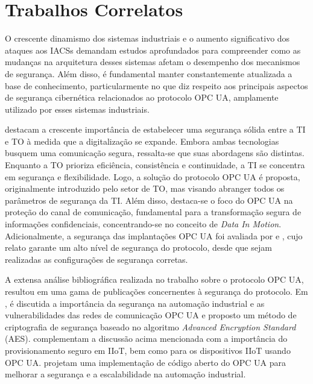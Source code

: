     \section{Trabalhos Correlatos} \label{sec:trabCorrelatos}

    O crescente dinamismo dos sistemas industriais e o aumento significativo dos ataques aos IACSs demandam estudos aprofundados para compreender como as mudanças na arquitetura desses sistemas afetam o desempenho dos mecanismos de segurança. Além disso, é fundamental manter constantemente atualizada a base de conhecimento, particularmente no que diz respeito aos principais aspectos de segurança cibernética relacionados ao protocolo OPC UA, amplamente utilizado por esses sistemas industriais.

     destacam a crescente importância de estabelecer uma segurança sólida entre a TI e TO à medida que a digitalização se expande. Embora ambas tecnologias busquem uma comunicação segura, ressalta-se que suas abordagens são distintas. Enquanto a TO prioriza eficiência, consistência e continuidade, a TI se concentra em segurança e flexibilidade. Logo, a solução do protocolo OPC UA é proposta, originalmente introduzido pelo setor de TO, mas visando abranger todos os parâmetros de segurança da TI. Além disso, destaca-se o foco do OPC UA na proteção do canal de comunicação, fundamental para a transformação segura de informações confidenciais, concentrando-se no conceito de \textit{Data In Motion}. Adicionalmente, a segurança das implantações OPC UA foi avaliada por  e , cujo relato garante um alto nível de segurança do protocolo, desde que sejam realizadas as configurações de segurança corretas.

    A extensa análise bibliográfica realizada no trabalho sobre o protocolo OPC UA, resultou em uma gama de publicações concernentes à segurança do protocolo. Em \cite{luo2020}, é discutida a importância da segurança na automação industrial e as vulnerabilidades das redes de comunicação OPC UA e proposto um método de criptografia de segurança baseado no algoritmo \textit{Advanced Encryption Standard} (AES).  complementam a discussão acima mencionada com a importância do provisionamento seguro em IIoT, bem como \cite{kohnhauser2022} para os dispositivos IIoT usando OPC UA.  projetam uma implementação de código aberto do OPC UA para melhorar a segurança e a escalabilidade na automação industrial.

